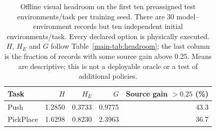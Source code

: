 \begin{table}[H]\centering\small
\caption{Offline visual headroom on the first ten preassigned test environments/task per training seed. There are 30 model--environment records but ten independent initial environments/task. Every declared option is physically executed. $H$, $H_E$ and $G$ follow Table~\ref{main-tab:headroom}; the last column is the fraction of records with some source gain above 0.25. Means are descriptive; this is not a deployable oracle or a test of additional policies.}\label{s-tab:visualoracle}
\begin{tabular}{lrrrr}\toprule Task & $H$ & $H_E$ & $G$ & Source gain $>0.25$ (\%)\\\midrule
Push & 1.2850 & 0.3733 & 0.9775 & 43.3\\
PickPlace & 1.6298 & 0.8230 & 2.3963 & 36.7\\
\bottomrule\end{tabular}\end{table}
